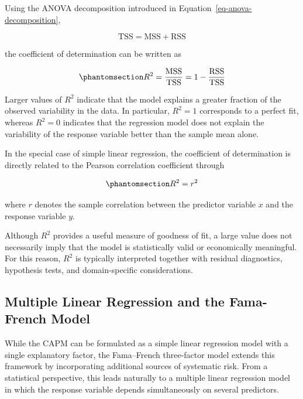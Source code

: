 \documentclass[
  12pt,
  letterpaper,
]{book}
\begin{document}
Using the ANOVA decomposition introduced in
Equation~\ref{eq-anova-decomposition},

\[
\mathrm{TSS}
=
\mathrm{MSS}
+
\mathrm{RSS}
\]

the coefficient of determination can be written as

\begin{equation}\phantomsection\label{eq-r-squared}{
R^2
=
\frac{
\mathrm{MSS}
}{
\mathrm{TSS}
}
=
1
-
\frac{
\mathrm{RSS}
}{
\mathrm{TSS}
}
}\end{equation}

Larger values of \(R^2\) indicate that the model explains a greater
fraction of the observed variability in the data. In particular,
\(R^2 = 1\) corresponds to a perfect fit, whereas \(R^2 = 0\) indicates
that the regression model does not explain the variability of the
response variable better than the sample mean alone.

In the special case of simple linear regression, the coefficient of
determination is directly related to the Pearson correlation coefficient
through

\begin{equation}\phantomsection\label{eq-r-squared-correlation}{
R^2 = r^2
}\end{equation}

where \(r\) denotes the sample correlation between the predictor
variable \(x\) and the response variable \(y\).

Although \(R^2\) provides a useful measure of goodness of fit, a large
value does not necessarily imply that the model is statistically valid
or economically meaningful. For this reason, \(R^2\) is typically
interpreted together with residual diagnostics, hypothesis tests, and
domain-specific considerations.

\subsection{Multiple Linear Regression and the Fama-French
Model}\label{multiple-linear-regression-and-the-fama-french-model}

While the CAPM can be formulated as a simple linear regression model
with a single explanatory factor, the Fama--French three-factor model
extends this framework by incorporating additional sources of systematic
risk. From a statistical perspective, this leads naturally to a multiple
linear regression model in which the response variable depends
simultaneously on several predictors.
\end{document}
